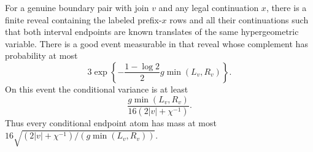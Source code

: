 \begin{lemma}\label{lem:upper-smoothing}
For a genuine boundary pair with join $v$ and any legal continuation
$x$, there is a finite reveal containing the labeled prefix-$x$ rows
and all their continuations such that both interval endpoints are
known translates of the same hypergeometric variable. There is a
good event measurable in that reveal whose complement has probability
at most
\[
 3\exp\left\{-\frac{1-\log2}{2}g\min(L_v,R_v)\right\}.
\]
On this event the conditional variance is at least
\[
 \frac{g\min(L_v,R_v)}{16(2|v|+\chi^{-1})}.
\]
Thus every conditional endpoint atom has mass at most
$16\sqrt{(2|v|+\chi^{-1})/(g\min(L_v,R_v))}$.
\end{lemma}
